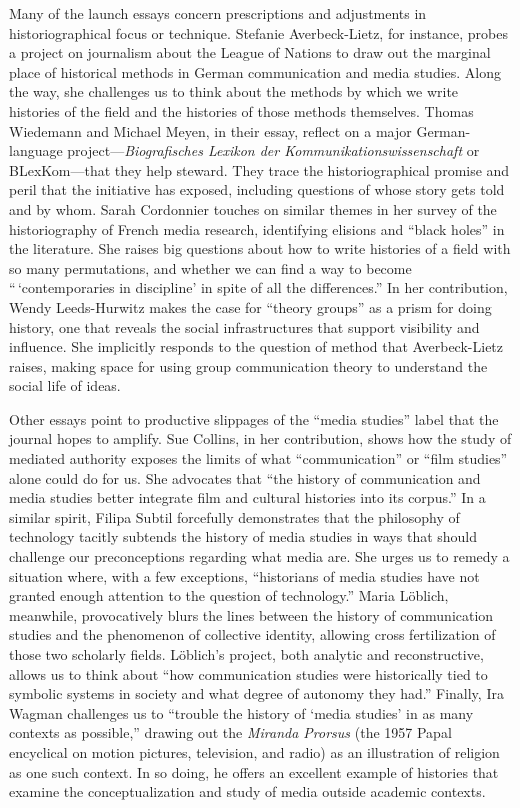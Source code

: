 \documentclass{tufte-handout}
\begin{document}
Many of the launch essays concern prescriptions and adjustments in
historiographical focus or technique. Stefanie Averbeck-Lietz, for
instance, probes a project on journalism about the League of Nations to
draw out the marginal place of historical methods in German
communication and media studies. Along the way, she challenges us to
think about the methods by which we write histories of the field and the
histories of those methods themselves. Thomas Wiedemann and Michael
Meyen, in their essay, reflect on a major German-language
project---\emph{Biografisches Lexikon der Kommunikationswissenschaft} or
BLexKom---that they help steward. They trace the historiographical
promise and peril that the initiative has exposed, including questions
of whose story gets told and by whom. Sarah Cordonnier touches on
similar themes in her survey of the historiography of French media
research, identifying elisions and ``black holes'' in the literature.
She raises big questions about how to write histories of a field with so
many permutations, and whether we can find a way to become
``\,`contemporaries in discipline' in spite of all the differences.'' In
her contribution, Wendy Leeds-Hurwitz makes the case for ``theory
groups'' as a prism for doing history, one that reveals the social
infrastructures that support visibility and influence. She implicitly
responds to the question of method that Averbeck-Lietz raises, making
space for using group communication theory to understand the social life
of ideas.

Other essays point to productive slippages of the ``media studies''
label that the journal hopes to amplify. Sue Collins, in her
contribution, shows how the study of mediated authority exposes the
limits of what ``communication'' or ``film studies'' alone could do for
us. She advocates that ``the history of communication and media studies
better integrate film and cultural histories into its corpus.'' In a
similar spirit, Filipa Subtil forcefully demonstrates that the
philosophy of technology tacitly subtends the history of media studies
in ways that should challenge our preconceptions regarding what media
are. She urges us to remedy a situation where, with a few exceptions,
``historians of media studies have not granted enough attention to the
question of technology.'' Maria Löblich, meanwhile, provocatively blurs
the lines between the history of communication studies and the
phenomenon of collective identity, allowing cross fertilization of those
two scholarly fields. Löblich's project, both analytic and
reconstructive, allows us to think about ``how communication studies
were historically tied to symbolic systems in society and what degree of
autonomy they had.'' Finally, Ira Wagman challenges us to ``trouble the
history of `media studies' in as many contexts as possible,'' drawing
out the \emph{Miranda Prorsus} (the 1957 Papal encyclical on motion
pictures, television, and radio) as an illustration of religion as one
such context. In so doing, he offers an excellent example of histories
that examine the conceptualization and study of media outside academic
contexts.
\end{document}
